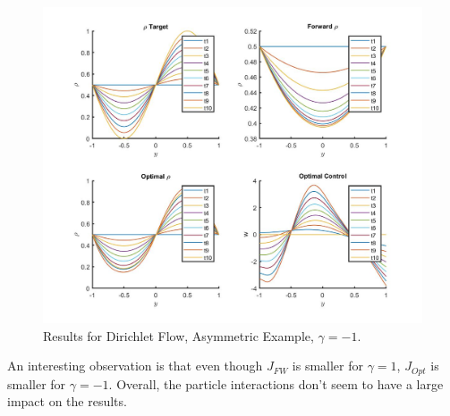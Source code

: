 \documentclass[11pt, a4paper]{article}
\theoremstyle{definition}
\begin{document}
\begin{figure}[h]
	\includegraphics[scale=0.3]{Res11.jpg}
	\caption{Results for Dirichlet Flow, Asymmetric Example, $\gamma = -1$.}
	\label{Res11}
\end{figure}
	
An interesting observation is that even though $J_{FW}$ is smaller for $\gamma =1$, $J_{Opt}$ is smaller for $\gamma = -1$. Overall, the particle interactions don't seem to have a large impact on the results.	
	
	
\end{document}
